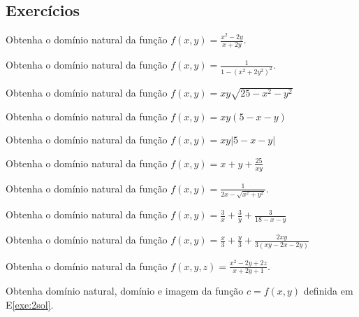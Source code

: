 
\subsection*{Exercícios}

\begin{exer}
Obtenha o domínio natural da função $f(x,y) = \frac{x^2-2y}{x+2y}$. 
\end{exer}

\begin{exer}
Obtenha o domínio natural da função $f(x,y) = \frac{1}{1-(x^2+2y^2)^2}$. 
\end{exer}

\begin{exer}
Obtenha o domínio natural da função $f(x,y) = xy\sqrt{25 - x^2 - y^2} $
\end{exer}

\begin{exer}
Obtenha o domínio natural da função $f(x,y) = xy(5 - x- y) $
\end{exer}

\begin{exer}
Obtenha o domínio natural da função $f(x,y) = xy |5 - x - y| $
\end{exer}

\begin{exer}
Obtenha o domínio natural da função  $f(x,y) = x + y + \frac{25}{xy}$
\end{exer}


\begin{exer}
Obtenha o domínio natural da função $f(x,y) = \frac{1}{2x-\sqrt{x^2+y^2}}$. 
\end{exer}

\begin{exer}
Obtenha o domínio natural da função $f(x,y) = \frac{3}{x} + \frac{3}{y} + \frac{3}{18-x-y}$
\end{exer}

\begin{exer}
Obtenha o domínio natural da função $f(x,y) = \frac{x}{3} + \frac{y}{3} + \frac{2xy}{3(xy-2x-2y)}$
\end{exer}

\begin{exer}
Obtenha o domínio natural da função $f(x,y,z) = \frac{x^2-2y + 2z}{x+2y+1}$. 
\end{exer}

\begin{exer}
Obtenha domínio natural, domínio e imagem da função $c=f(x,y)$ definida em E\ref{exe:2sol}.
\end{exer}

